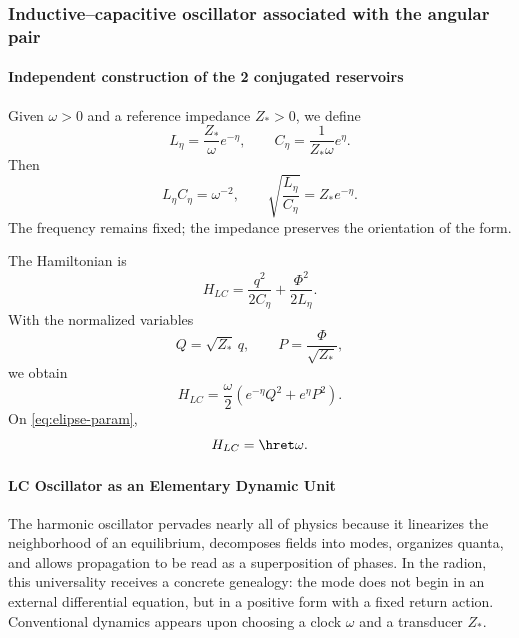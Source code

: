 \subsubsection{Inductive--capacitive oscillator associated with the angular pair}

\paragraph{Independent construction of the 2 conjugated reservoirs}

Given \(\omega>0\) and a reference impedance \(Z_*>0\), we define
\begin{equation}
L_\eta=\frac{Z_*}{\omega}e^{-\eta},
\qquad
C_\eta=\frac{1}{Z_*\omega}e^\eta.
\label{eq:LC-def}
\end{equation}
Then
\begin{equation}
L_\eta C_\eta=\omega^{-2},
\qquad
\sqrt{\frac{L_\eta}{C_\eta}}=Z_*e^{-\eta}.
\label{eq:LC-invariants}
\end{equation}
The frequency remains fixed; the impedance preserves the orientation of the form.

The Hamiltonian is
\begin{equation}
H_{LC}=\frac{q^2}{2C_\eta}+\frac{\Phi^2}{2L_\eta}.
\label{eq:HLC}
\end{equation}
With the normalized variables
\begin{equation}
Q=\sqrt{Z_*}\,q,\qquad
P=\frac{\Phi}{\sqrt{Z_*}},
\label{eq:LC-map}
\end{equation}
we obtain
\begin{equation}
H_{LC}=\frac\omega2
\left(e^{-\eta}Q^2+e^\eta P^2\right).
\label{eq:HLC-QP}
\end{equation}
On \eqref{eq:elipse-param},
\begin{equation}
H_{LC}=\hret\omega.
\label{eq:LC-level}
\end{equation}

\paragraph{LC Oscillator as an Elementary Dynamic Unit}

The harmonic oscillator pervades nearly all of physics because it linearizes the neighborhood of an equilibrium, decomposes fields into modes, organizes quanta, and allows propagation to be read as a superposition of phases. In the radion, this universality receives a concrete genealogy: the mode does not begin in an external differential equation, but in a positive form with a fixed return action. Conventional dynamics appears upon choosing a clock \(\omega\) and a transducer \(Z_*\).

